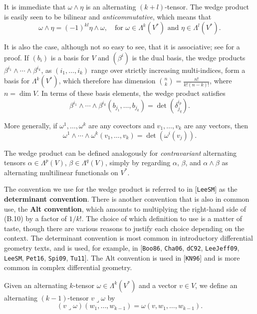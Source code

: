 It is immediate that $\omega \wedge \eta$ is an alternating $(k + l)$-tensor. The wedge product is easily seen to be bilinear and \textit{anticommutative}, which means that
\[
\omega \wedge \eta = (-1)^{kl} \eta \wedge \omega, \quad \text{for } \omega \in \Lambda^k(V^*) \text{ and } \eta \in \Lambda^l(V^*).
\]

It is also the case, although not so easy to see, that it is associative; see \cite[Prop.~14.11]{LeeSM} for a proof. If $(b_i)$ is a basis for $V$ and $(\beta^i)$ is the dual basis, the wedge products $\beta^{i_1} \wedge \cdots \wedge \beta^{i_k}$, as $(i_1,\ldots,i_k)$ range over strictly increasing multi-indices, form a basis for $\Lambda^k(V^*)$, which therefore has dimension $\binom{n}{k} = \frac{n!}{k!(n-k)!}$, where $n = \dim V$. In terms of these basis elements, the wedge product satisfies
\[
\beta^{i_1} \wedge \cdots \wedge \beta^{i_k}(b_{j_1},\ldots,b_{j_k}) = \det(\delta^{i_p}_{j_q}).
\]

More generally, if $\omega^1,\ldots,\omega^k$ are any covectors and $v_1,\ldots,v_k$ are any vectors, then
\begin{equation}
\omega^1 \wedge \cdots \wedge \omega^k(v_1,\ldots,v_k) = \det(\omega^i(v_j)).
\tag{B.10}
\end{equation}

The wedge product can be defined analogously for \emph{contravariant} alternating tensors $\alpha \in \Lambda^p(V)$, $\beta \in \Lambda^q(V)$, simply by regarding $\alpha$, $\beta$, and $\alpha \wedge \beta$ as alternating multilinear functionals on $V^*$.

The convention we use for the wedge product is referred to in [\texttt{LeeSM}] as the \textbf{determinant convention}. There is another convention that is also in common use, the \textbf{Alt convention}, which amounts to multiplying the right-hand side of (B.10) by a factor of $1/k!$. The choice of which definition to use is a matter of taste, though there are various reasons to justify each choice depending on the context. The determinant convention is most common in introductory differential geometry texts, and is used, for example, in [\texttt{Boo86}, \texttt{Cha06}, \texttt{dC92}, \texttt{LeeJeff09}, \texttt{LeeSM}, \texttt{Pet16}, \texttt{Spi09}, \texttt{Tu11}]. The Alt convention is used in [\texttt{KN96}] and is more common in complex differential geometry.

Given an alternating $k$-tensor $\omega \in \Lambda^k(V^*)$ and a vector $v \in V$, we define an alternating $(k-1)$-tensor $v \lrcorner \omega$ by
\[
(v \lrcorner \omega)(w_1,\ldots,w_{k-1}) = \omega(v,w_1,\ldots,w_{k-1}).
\]

